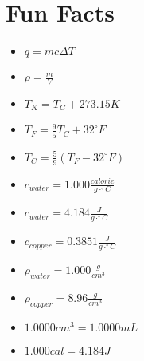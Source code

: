 \documentclass[11pt,addpoints]{exam}   	%
\begin{document}
\pagebreak
\section*{Fun Facts}
\begin{itemize}
\item
$q = m c \Delta T$
\vspace{0.2in}

\item
$\rho = \frac{m}{V} $
\vspace{0.2in}

\item
$T_K = T_C + 273.15 K$
\vspace{0.2in}

\item
$T_F = \frac{9}{5}T_C + 32^{\circ}F$
\vspace{0.2in}

\item
$T_C = \frac{5}{9}(T_F - 32^{\circ}F)$
\vspace{0.2in}

\item
$c_{water} = 1.000 \frac{calorie}{g \cdot ^{\circ}C}$
\vspace{0.2in}

\item
$c_{water} = 4.184 \frac{J}{g \cdot ^{\circ}C}$
\vspace{0.2in}

\item
$c_{copper} = 0.3851 \frac{J}{g \cdot ^{\circ}C}$
\vspace{0.2in}

\item
$\rho_{water} = 1.000 \frac{g}{cm^3}$
\vspace{0.2in}

\item
$\rho_{copper} = 8.96 \frac{g}{cm^3}$
\vspace{0.2in}

\item
$ 1.0000 cm^3 = 1.0000 mL $
\vspace{0.2in}

\item
$ 1.000 cal = 4.184 J $
\end{itemize}
\vspace{0.2in}
\end{document}

